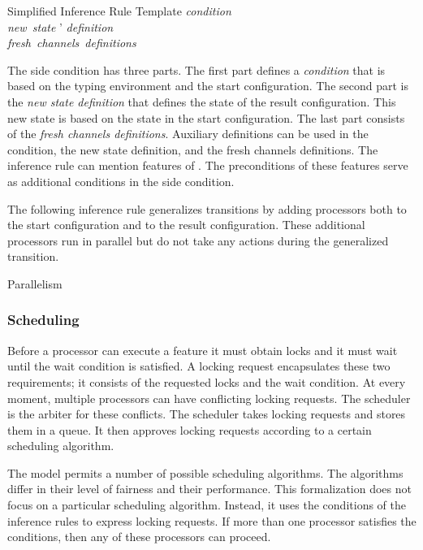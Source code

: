 \singlelineinferencerule
	{Simplified Inference Rule Template}
	{
		\mbox{\it{condition}} \\
		\mbox{\it{new state}} \thinspace \state' \thinspace \mbox{\it{definition}}\\
		\mbox{\it{fresh channels definitions}}
	}
	{}
	{}

The side condition has three parts. The first part defines a \emph{condition} that is based on the typing environment and the start configuration. The second part is the \emph{new state definition} that defines the state of the result configuration. This new state is based on the state in the start configuration. The last part consists of the \emph{fresh channels definitions}. Auxiliary definitions can be used in the condition, the new state definition, and the fresh channels definitions. The inference rule can mention features of . The preconditions of these features serve as additional conditions in the side condition.

The following inference rule generalizes transitions by adding processors both to the start configuration and to the result configuration. These additional processors run in parallel but do not take any actions during the generalized transition.

\singlelineinferencerule
	{Parallelism}
	{
		\singlelinetransition
			{}
			{}
	}
	{}
	{}
 
\subsubsection{Scheduling}\label{sec:scheduling}
Before a processor can execute a feature it must obtain locks and it must wait until the wait condition is satisfied. A locking request encapsulates these two requirements; it consists of the requested locks and the wait condition. At every moment, multiple processors can have conflicting locking requests. The scheduler is the arbiter for these conflicts. The scheduler takes locking requests and stores them in a queue. It then approves locking requests according to a certain scheduling algorithm.

The model permits a number of possible scheduling algorithms. The algorithms differ in their level of fairness and their performance. This formalization does not focus on a particular scheduling algorithm. Instead, it uses the conditions of the inference rules to express locking requests. If more than one processor satisfies the conditions, then any of these processors can proceed.

